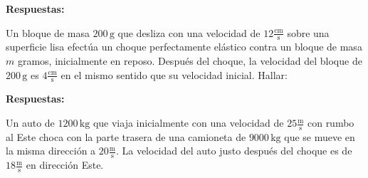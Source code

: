 \documentclass[addpoints]{exam}
\newcommand{\un}[1]{\text{#1}}
\newcommand{\rtas}{\textbf{Respuestas: }}
\begin{document}
\begin{questions}
    \rtas 

    \question Un bloque de masa $200 \, \un{g}$ que desliza con una velocidad de $12 \frac{\un{cm}}{\un{s}}$ sobre una superficie lisa efectúa un choque perfectamente elástico contra un bloque de masa $m$ gramos, inicialmente en reposo. Después del choque, la velocidad del bloque de $200 \, \un{g}$ es $4 \frac{\un{cm}}{\un{s}}$ en el mismo sentido que su velocidad inicial. Hallar:


    \rtas

    \question Un auto de $1200 \, \un{kg}$ que viaja inicialmente con una velocidad de $25 \frac{\un{m}}{\un{s}}$ con rumbo al Este choca con la parte trasera de una camioneta de $9000 \, \un{kg}$ que se mueve en la misma dirección a $20 \frac{\un{m}}{\un{s}}$. La velocidad del auto justo después del choque es de $18 \frac{\un{m}}{\un{s}}$ en dirección Este. 


\end{questions}
\end{document}
